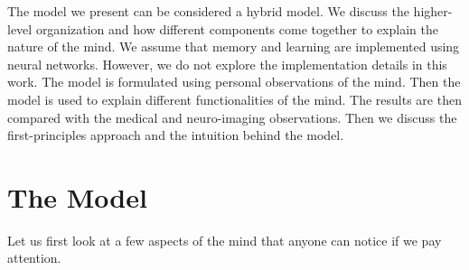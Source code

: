 \documentclass[reprint,amsmath,amssymb,apr,aip,onecolumn, 11pt]{revtex4-1}
\begin{document}
	The model we present can be considered a hybrid model. We discuss the higher-level organization and how different components come together to explain the nature of the mind. We assume that memory and learning are implemented using neural networks. However, we do not explore the implementation details in this work. The model is formulated using personal observations of the mind. Then the model is used to explain different functionalities of the mind. The results are then compared with the medical and neuro-imaging observations. Then we discuss the first-principles approach and the intuition behind the model. 
	
	
	
	\section{The Model }
	Let us first look at a few aspects of the mind that anyone can notice if we pay attention. 
	
\end{document}
